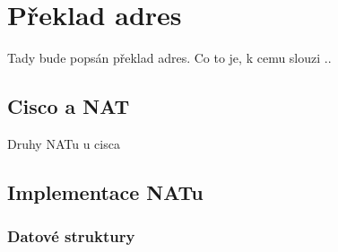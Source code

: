 \section{Překlad adres}

Tady bude popsán překlad adres. Co to je, k cemu slouzi ..

\subsection{Cisco a NAT}
Druhy NATu u cisca

\subsection{Implementace NATu}


\subsubsection{Datové struktury}


